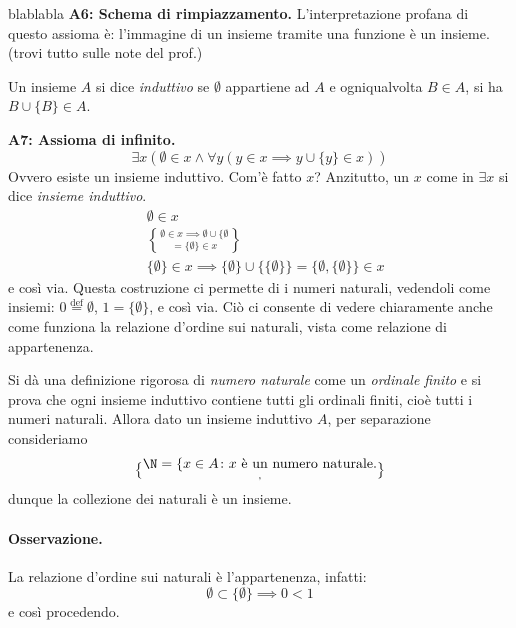 blablabla
{\bf A6: Schema di rimpiazzamento.} L'interpretazione profana di questo assioma è: l'immagine di un insieme tramite una funzione è un insieme. (trovi tutto sulle note del prof.)

\begin{dfn}
  Un insieme \(A\) si dice \emph{induttivo} se \(\emptyset\) appartiene ad \(A\) e ogniqualvolta \(B \in A\), si ha \(B \cup \lbrace B \rbrace \in A\).
\end{dfn}
{\bf A7: Assioma di infinito.}
\begin{equation}
  \exists x \left( \emptyset \in x \land \forall y (y \in x \implies y \cup \lbrace y \rbrace \in x)\right)
\end{equation}
Ovvero esiste un insieme induttivo.
Com'è fatto \(x\)? Anzitutto, un \(x\) come in \(\exists x\) si dice \emph{insieme induttivo}.
\begin{align*}
  &\emptyset \in x \\
  &\emptyset \in x \implies \emptyset \cup \lbrace \emptyset \brace = \lbrace \emptyset \rbrace \in x \\
  &\lbrace \emptyset \rbrace \in x \implies \lbrace \emptyset \rbrace \cup \lbrace\lbrace \emptyset \rbrace\rbrace = \lbrace \emptyset, \lbrace \emptyset \rbrace \rbrace \in x
\end{align*}
e così via. Questa costruzione ci permette di  i numeri naturali, vedendoli come insiemi: \(0 \overset{\mathrm{def}}{=} \emptyset\), \(1 = \lbrace \emptyset \rbrace\), e così via. Ciò ci consente di vedere chiaramente anche come funziona la relazione d'ordine sui naturali, vista come relazione di appartenenza.

Si dà una definizione rigorosa di \emph{numero naturale} come un \emph{ordinale finito} e si prova che ogni insieme induttivo contiene tutti gli ordinali finiti, cioè tutti i numeri naturali. Allora dato un insieme induttivo \(A\), per separazione consideriamo
\[
\N = \lbrace x \in A \colon x \text{ è un numero naturale.} \brace,
\]
dunque la collezione dei naturali è un insieme.
\paragraph{Osservazione.} La relazione d'ordine sui naturali è l'appartenenza, infatti:
\[
\emptyset \subset \lbrace \emptyset \rbrace \implies 0 < 1
\]
e così procedendo.

